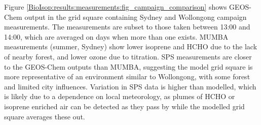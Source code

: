     
    Figure \ref{BioIsop:results:measurements:fig_campaign_comparison} shows GEOS-Chem output in the grid square containing Sydney and Wollongong campaign measurements.
    The measurements are subset to those taken between 13:00 and 14:00, which are averaged on days when more than one exists.
    MUMBA measurements (summer, Sydney) show lower isoprene and HCHO due to the lack of nearby forest, and lower ozone due to titration.
    SPS measurements are closer to the GEOS-Chem outputs than MUMBA, suggesting the model grid square is more representative of an environment similar to Wollongong, with some forest and limited city influences.
    Variation in SPS data is higher than modelled, which is likely due to a dependence on local meteorology, as plumes of HCHO or isoprene enriched air can be detected as they pass by while the modelled grid square averages these out.
    
    
    
